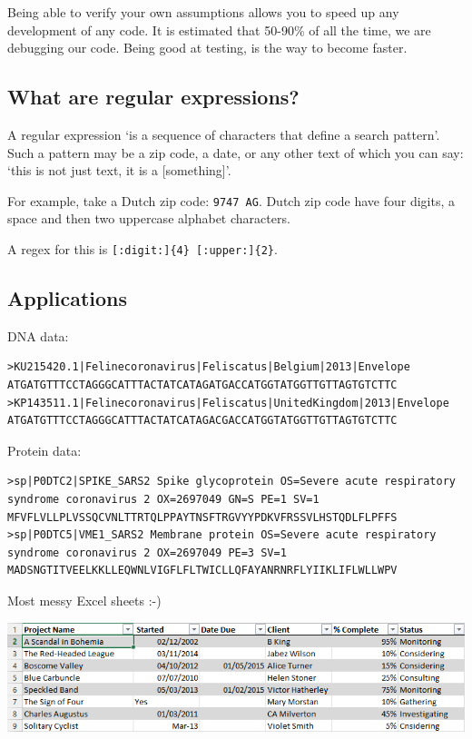 \documentclass[]{book}
\begin{document}
Being able to verify your own assumptions allows you to speed
up any development of any code. It is estimated that 50-90\%
of all the time, we are debugging our code. Being good at
testing, is the way to become faster.

\hypertarget{what-are-regular-expressions}{%
\subsection{What are regular expressions?}\label{what-are-regular-expressions}}

A regular expression `is a sequence of characters that define a
search pattern'. Such a pattern may be a zip code, a date,
or any other text of which you can say: `this is not just text,
it is a {[}something{]}'.

For example, take a Dutch zip code: \texttt{9747\ AG}. Dutch zip
code have four digits, a space and then two uppercase
alphabet characters.

A regex for this is \texttt{{[}:digit:{]}\{4\}\ {[}:upper:{]}\{2\}}.

\hypertarget{applications}{%
\subsection{Applications}\label{applications}}

DNA data:

\begin{verbatim}
>KU215420.1|Felinecoronavirus|Feliscatus|Belgium|2013|Envelope
ATGATGTTTCCTAGGGCATTTACTATCATAGATGACCATGGTATGGTTGTTAGTGTCTTC
>KP143511.1|Felinecoronavirus|Feliscatus|UnitedKingdom|2013|Envelope
ATGATGTTTCCTAGGGCATTTACTATCATAGACGACCATGGTATGGTTGTTAGTGTCTTC
\end{verbatim}

Protein data:

\begin{verbatim}
>sp|P0DTC2|SPIKE_SARS2 Spike glycoprotein OS=Severe acute respiratory syndrome coronavirus 2 OX=2697049 GN=S PE=1 SV=1
MFVFLVLLPLVSSQCVNLTTRTQLPPAYTNSFTRGVYYPDKVFRSSVLHSTQDLFLPFFS
>sp|P0DTC5|VME1_SARS2 Membrane protein OS=Severe acute respiratory syndrome coronavirus 2 OX=2697049 PE=3 SV=1
MADSNGTITVEELKKLLEQWNLVIGFLFLTWICLLQFAYANRNRFLYIIKLIFLWLLWPV
\end{verbatim}

Most messy Excel sheets :-)

\includegraphics{data/06_messy_excel.png}
\end{document}
